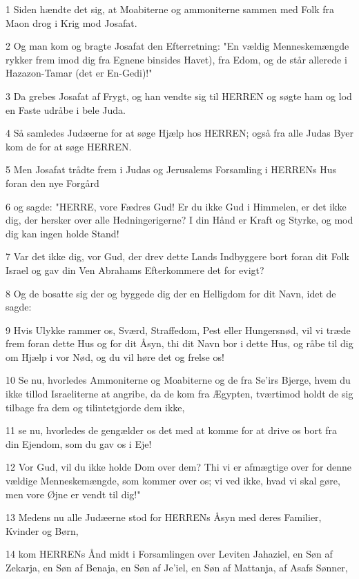 \par 1 Siden hændte det sig, at Moabiterne og ammoniterne sammen med Folk fra Maon drog i Krig mod Josafat.
\par 2 Og man kom og bragte Josafat den Efterretning: "En vældig Menneskemængde rykker frem imod dig fra Egnene binsides Havet), fra Edom, og de står allerede i Hazazon-Tamar (det er En-Gedi)!"
\par 3 Da grebes Josafat af Frygt, og han vendte sig til HERREN og søgte ham og lod en Faste udråbe i bele Juda.
\par 4 Så samledes Judæerne for at søge Hjælp hos HERREN; også fra alle Judas Byer kom de for at søge HERREN.
\par 5 Men Josafat trådte frem i Judas og Jerusalems Forsamling i HERRENs Hus foran den nye Forgård
\par 6 og sagde: "HERRE, vore Fædres Gud! Er du ikke Gud i Himmelen, er det ikke dig, der hersker over alle Hedningerigerne? I din Hånd er Kraft og Styrke, og mod dig kan ingen holde Stand!
\par 7 Var det ikke dig, vor Gud, der drev dette Lands Indbyggere bort foran dit Folk Israel og gav din Ven Abrahams Efterkommere det for evigt?
\par 8 Og de bosatte sig der og byggede dig der en Helligdom for dit Navn, idet de sagde:
\par 9 Hvis Ulykke rammer os, Sværd, Straffedom, Pest eller Hungersnød, vil vi træde frem foran dette Hus og for dit Åsyn, thi dit Navn bor i dette Hus, og råbe til dig om Hjælp i vor Nød, og du vil høre det og frelse os!
\par 10 Se nu, hvorledes Ammoniterne og Moabiterne og de fra Se'irs Bjerge, hvem du ikke tillod Israeliterne at angribe, da de kom fra Ægypten, tværtimod holdt de sig tilbage fra dem og tilintetgjorde dem ikke,
\par 11 se nu, hvorledes de gengælder os det med at komme for at drive os bort fra din Ejendom, som du gav os i Eje!
\par 12 Vor Gud, vil du ikke holde Dom over dem? Thi vi er afmægtige over for denne vældige Menneskemængde, som kommer over os; vi ved ikke, hvad vi skal gøre, men vore Øjne er vendt til dig!"
\par 13 Medens nu alle Judæerne stod for HERRENs Åsyn med deres Familier, Kvinder og Børn,
\par 14 kom HERRENs Ånd midt i Forsamlingen over Leviten Jahaziel, en Søn af Zekarja, en Søn af Benaja, en Søn af Je'iel, en Søn af Mattanja, af Asafs Sønner,
